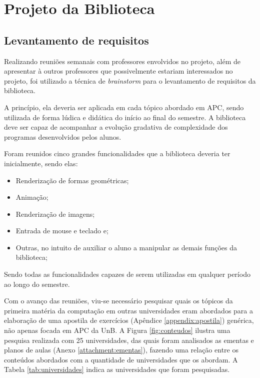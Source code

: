 \section{Projeto da Biblioteca} \label{sec:projeto}

\subsection{Levantamento de requisitos}
Realizando reuniões semanais com professores envolvidos no projeto, além de apresentar à outros professores que possivelmente estariam interessados no projeto, foi utilizado a técnica de \emph{brainstorm} para o levantamento de requisitos da biblioteca.

A princípio, ela deveria ser aplicada em cada tópico abordado em \acrshort{APC}, sendo utilizada de forma lúdica e didática do início ao final do semestre. A biblioteca deve ser capaz de acompanhar a evolução gradativa de complexidade dos programas desenvolvidos pelos alunos.

Foram reunidos cinco grandes funcionalidades que a biblioteca deveria ter inicialmente, sendo elas: 
 \begin{itemize}
 \item Renderização de formas geométricas;
 \item Animação;
 \item Renderização de imagens;
 \item Entrada de mouse e teclado e;
 \item Outras, no intuito de auxiliar o aluno a manipular as demais funções da biblioteca;
 \end{itemize}

Sendo todas as funcionalidades capazes de serem utilizadas em qualquer período ao longo do semestre.

Com o avanço das reuniões, viu-se necessário pesquisar quais os tópicos da primeira matéria da computação em outras universidades eram abordados para a elaboração de uma apostila de exercícios (Apêndice \ref{appendix:apostila}) genérica, não apenas focada em \acrshort{APC} da \acrshort{UnB}. A Figura \ref{fig:conteudos} ilustra uma pesquisa realizada com 25 universidades, das quais foram analisados as ementas e planos de aulas (Anexo \ref{attachment:ementas}), fazendo uma relação entre os conteúdos abordados com a quantidade de universidades que os abordam. A Tabela \ref{tab:universidades} indica as universidades que foram pesquisadas.

